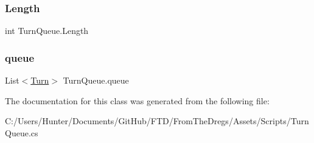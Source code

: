 \subsubsection{\texorpdfstring{Length}{Length}}
{\footnotesize\ttfamily int Turn\+Queue.\+Length\hspace{0.3cm}{\ttfamily [get]}}

\mbox{\label{class_turn_queue_a55c5122a7e3ce31ec8b79e9feb14bd27}} 
\subsubsection{\texorpdfstring{queue}{queue}}
{\footnotesize\ttfamily List$<$\mbox{\hyperlink{class_turn}{Turn}}$>$ Turn\+Queue.\+queue\hspace{0.3cm}{\ttfamily [get]}}



The documentation for this class was generated from the following file\+:\begin{DoxyCompactItemize}
\item 
C\+:/\+Users/\+Hunter/\+Documents/\+Git\+Hub/\+F\+T\+D/\+From\+The\+Dregs/\+Assets/\+Scripts/Turn\+Queue.\+cs\end{DoxyCompactItemize}
